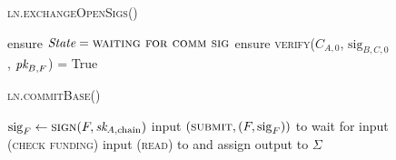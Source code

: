 \begin{figure}[H]
\begin{processbox}{\textsc{ln.exchangeOpenSigs}()}
\begin{algorithmic}[1]
      \State {}
      \label{code:ln:exchange-open-sigs:b-sign}
       
        \State {}
      \Else \: 
        \State {}
        \State {}
        \label{code:ln:exchange-open-sigs:state-open}
      \EndIf
      \State {}
      \label{code:ln:exchange-open-sigs:b-send}
      \State ensure $\itistate = \textsc{waiting for comm sig}$
      \State ensure \textsc{verify}($C_{A, 0}$, $\mathrm{sig}_{B, C, 0}$,
      $\textit{pk}_{B, F}$) = True
      \label{code:ln:exchange-open-sigs:a-verify}
    \end{algorithmic}
  \end{processbox}
  \caption{}
  \label{code:ln:exchange-open-sigs}
\end{figure}

\begin{figure}[H]
  \begin{processbox}{\textsc{ln.commitBase}()}
    \begin{algorithmic}[1]
      \State $\mathrm{sig}_F \gets \textsc{sign}(F, \textit{sk}_{A, \mathrm{chain}})$
      \label{code:ln:base:sign-funding}
      \State input $(\textsc{submit}, (F, \mathrm{sig}_F))$ to \ledger{}
      \label{code:ln:commit-base:f-in-state}
        \State wait for input (\textsc{check funding}) 
        \State input (\textsc{read}) to \ledger and assign output to $\Sigma$
      \EndWhile
    \end{algorithmic}
  \end{processbox}
  \caption{}
  \label{code:ln:commit-base}
\end{figure}

